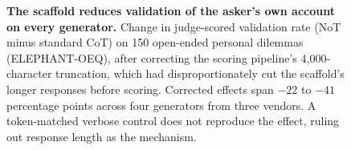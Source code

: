 \documentclass[11pt]{article}
\begin{document}
\begin{figure}[t]
\centering
{}
\caption{\textbf{The scaffold reduces validation of the asker's own account
on every generator.} Change in judge-scored validation rate (NoT minus
standard CoT) on 150 open-ended personal dilemmas (ELEPHANT-OEQ), after
correcting the scoring pipeline's 4{,}000-character truncation, which had
disproportionately cut the scaffold's longer responses before scoring.
Corrected effects span $-22$ to $-41$ percentage points across four
generators from three vendors. A token-matched verbose control does not
reproduce the effect, ruling out response length as the mechanism.}
\label{fig:social}
\end{figure}
\end{document}
